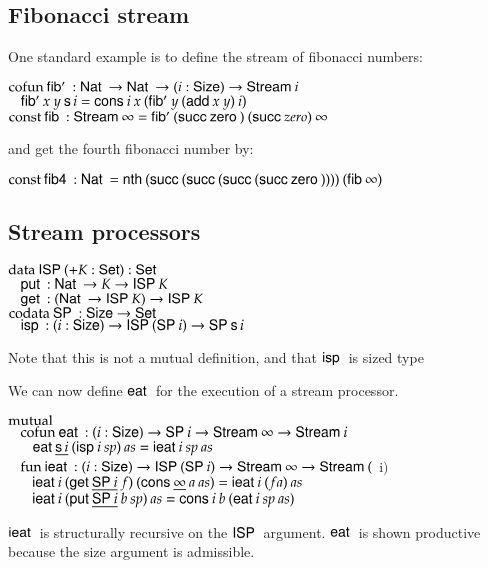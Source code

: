 \subsection{Fibonacci stream}

One standard example is to define the stream of fibonacci numbers:
\begin{bsp}
$\cofun \fibs : \Nat \ra \Nat \ra \EPi{i}{\Size}{\Stream i}$\\
$\spc  \fibs x \: y \: \s i = \cons i \: x \: (\fibs y \: (\add x \: y) \: i)$\\

$\const \fib : \Stream \infty = \fibs (\suc \zero) \: (\suc zero) \: \infty$
\end{bsp}
and get the fourth fibonacci number by:
\begin{bsp}
$\const \fibf : \Nat = \nth (\suc (\suc (\suc (\suc \zero )))) \: (\fib \infty)$
\end{bsp}
\subsection{Stream processors}
\begin{bsp}
$\data \ispd (+ K : \Set ) : \Set$\\
$\spc\putd : \Nat \ra K \ra \ispd K$\\
$\spc \getd : (\Nat \ra \ispd K) \ra \ispd K$\\ 
$\codata \spd : \Size \ra \Set$\\
$\spc \isp : (i : \Size ) \ra \ispd (\spd i) \ra \spd \s i$\\
\end{bsp}
Note that this is not a mutual definition, and that $\isp$ is sized type

We can now define $\eat$ for the execution of a stream processor.
\begin{bsp}
$\mutual $\\
$\spc \cofun \eat : (i : \Size ) \ra \spd i \ra \Stream \infty \ra \Stream i$ \\
$\spc \spc \eat \inacc{\s i} \: (\isp i \: sp) \: as = \ieat i \: sp \: as $ \\
$\spc \fun \ieat : (i : \Size ) \ra \ispd (\spd i) \ra \Stream \infty \ra \Stream ($ i$)$\\
$\spc \spc \ieat i\: (\getd \inacc{\spd i} \: f) \: (\cons \inacc{\infty} \: a \: as) = \ieat i \: (f a) \: as$\\
$\spc \spc \ieat i\: (\putd \inacc{\spd i} \: b \: sp) \: as  = \cons i \: b \: (\eat i \: sp \: as) $\\
\end{bsp}
$\ieat$ is structurally recursive on the $\ispd$ argument.
$\eat$ is shown productive because the size argument is admissible.
